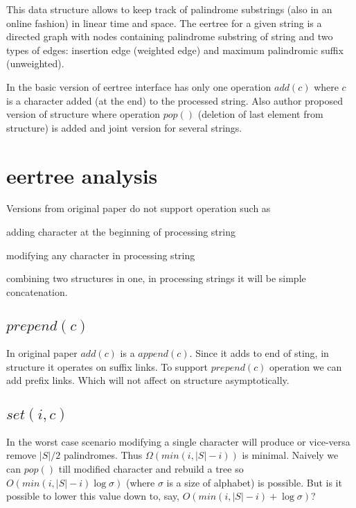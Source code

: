 This data structure allows to keep track of palindrome substrings (also in an online fashion) in linear time and space. The eertree for a given string is a directed graph with nodes containing palindrome substring of string and two types of edges: insertion edge (weighted edge)
and maximum palindromic suffix (unweighted).

In the basic version of eertree interface has only one operation $add(c)$ where $c$ is a character added (at the end) to the processed string. Also author proposed version of structure where operation $pop()$ (deletion of last element from structure) is added and joint version for several strings. 

\section{eertree analysis}
Versions from original paper do not support operation such as 

\begin{description}[align=right,labelwidth=1.5cm]
\item [prepend] adding character at the beginning of processing string
\item [set] modifying any character in processing string
\item [merge] combining two structures in one, in processing strings it will be simple concatenation.
\end{description}

\subsection{$prepend(c)$}
In original paper $add(c)$ is a $append(c)$. Since it adds to end of sting, in structure it operates on suffix links. 
To support $prepend(c)$ operation we can add prefix links. Which will not affect on structure asymptotically. 

\subsection{$set(i, c)$}
In the worst case scenario modifying a single character will produce or vice-versa remove $\lvert S \rvert/2$ palindromes.
Thus $\Omega(min(i, \lvert S \rvert - i))$ is minimal. Naively we can $pop()$ till modified character and rebuild a tree so $O(min(i, \lvert S \rvert - i) \log \sigma)$ (where $\sigma$ is a size of alphabet) is possible. But is it possible to lower this value down to, say, $O(min(i, \lvert S \rvert - i) + \log \sigma)$?

